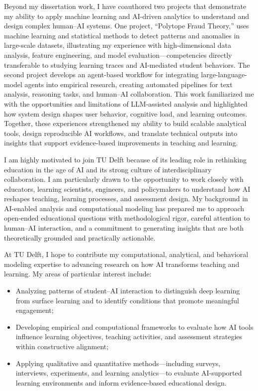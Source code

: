 \documentclass[11pt]{article}
\begin{document}
Beyond my dissertation work, I have coauthored two projects that demonstrate my ability to apply machine learning and AI-driven analytics to understand and design complex human–AI systems. 
One project, “Polytope Fraud Theory,” uses machine learning and statistical methods to detect patterns and anomalies in large-scale datasets, illustrating my experience with high-dimensional data analysis, feature engineering, and model evaluation—competencies directly transferable to studying learning traces and AI-mediated student behaviors. 
The second project develops an agent-based workflow for integrating large-language-model agents into empirical research, creating automated pipelines for text analysis, reasoning tasks, and human–AI collaboration. 
This work familiarized me with the opportunities and limitations of LLM-assisted analysis and highlighted how system design shapes user behavior, cognitive load, and learning outcomes. 
Together, these experiences strengthened my ability to build scalable analytical tools, design reproducible AI workflows, and translate technical outputs into insights that support evidence-based improvements in teaching and learning.

I am highly motivated to join TU Delft because of its leading role in rethinking education in the age of AI and its strong culture of interdisciplinary collaboration. 
I am particularly drawn to the opportunity to work closely with educators, learning scientists, engineers, and policymakers to understand how AI reshapes teaching, learning processes, and assessment design. 
My background in AI-enabled analysis and computational modeling has prepared me to approach open-ended educational questions with methodological rigor, careful attention to human–AI interaction, and a commitment to generating insights that are both theoretically grounded and practically actionable. 

At TU Delft, I hope to contribute my computational, analytical, and behavioral modeling expertise to advancing research on how AI transforms teaching and learning. 
My areas of particular interest include:
\begin{itemize}
    \item Analyzing patterns of student–AI interaction to distinguish deep learning from surface learning and to identify conditions that promote meaningful engagement;
    \item Developing empirical and computational frameworks to evaluate how AI tools influence learning objectives, teaching activities, and assessment strategies within constructive alignment;
    \item Applying qualitative and quantitative methods—including surveys, interviews, experiments, and learning analytics—to evaluate AI-supported learning environments and inform evidence-based educational design.
\end{itemize}
\end{document}
